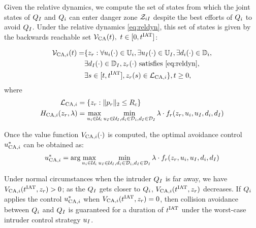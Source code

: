 Given the relative dynamics, we compute the set of states from which the joint states of $Q_{I}$ and $Q_i$ can enter danger zone $\mathcal{Z}_{iI}$ despite the best efforts of $Q_i$ to avoid $Q_{I}$. Under the relative dynamics \eqref{eq:reldyn}, this set of states is given by the backwards reachable set $\mathcal{V}_\text{CA}(t),~ t \in [0, t^\text{IAT}]$:%

\begin{equation} \label{eqn:optAvoid}
\begin{aligned}
\brs_{\text{CA}, i}(t) = & \{\state_r: \forall \ctrl_i(\cdot) \in \cfset_i, \exists \ctrl_\intr(\cdot) \in \cfset_\intr, \exists \dstb_i(\cdot) \in \dfset_i, \\
& \exists \dstb_\intr(\cdot) \in \dfset_\intr, \state_r(\cdot) \text{ satisfies \eqref{eq:reldyn}},\\
& \exists s \in [t, \iat], \state_r(s) \in \targetset_{\text{CA}, i}\}, t \geq 0, 
\end{aligned}
\end{equation}
where 
\begin{equation}
\begin{aligned}
\mathcal{L}_{\text{CA}, i} &= \{z_r: \|p_r\|_2 \le R_c\} \\
H_{\text{CA}, i}(z_r, \lambda) &= \max_{u_i \in \mathcal{U}_i} \min_{u_I \in \mathcal{U}_I, d_i \in \mathcal{D}_i, d_I \in \mathcal{D}_I} \lambda \cdot f_r(z_r, u_i, u_I, d_i, d_I)
\end{aligned}
\end{equation}

Once the value function $V_{\text{CA}, i}(\cdot)$ is computed, the optimal avoidance control $u^*_{\text{CA}, i}$ can be obtained as:
\begin{equation}
u^*_{\text{CA}, i} = \arg \max_{u_i \in \mathcal{U}_i} \min_{u_I \in \mathcal{U}_I, d_i \in \mathcal{D}_i, d_I \in \mathcal{D}_I} \lambda \cdot f_r(z_r, u_i, u_I, d_i, d_I)
\end{equation}

Under normal circumstances when the intruder $Q_{I}$ is far away, we have $V_{\text{CA}, i}(t^\text{IAT}, z_r) > 0$; as the $Q_{I}$ gets closer to $Q_i$, $V_{\text{CA}, i}(t^\text{IAT}, z_r)$ decreases. If $Q_i$ applies the control $u^*_{\text{CA}, i}$ when $V_{\text{CA}, i}(t^\text{IAT}, z_r) = 0$, then collision avoidance between $Q_i$ and $Q_{I}$ is guaranteed for a duration of $t^\text{IAT}$ under the worst-case intruder control strategy $u_I$.

